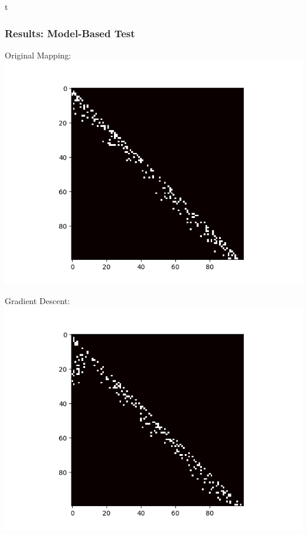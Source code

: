 \begin{frame}{t}
    \frametitle{Results: Model-Based Test}

    \hspace{-2em}
	\begin{minipage}{0.49\textwidth}
		\begin{center}
            Original Mapping:\\
			\includegraphics[scale=0.4]{figures/original_adj_100.png}
		\end{center}
	\end{minipage}
	\hspace{1em}
	\begin{minipage}{0.49\textwidth}
		\begin{center}
            \hspace{0.1em} Gradient Descent:\\
			\includegraphics[scale=0.4]{figures/sgd_adj_100.png}
		\end{center}
	\end{minipage}
    

\end{frame}


